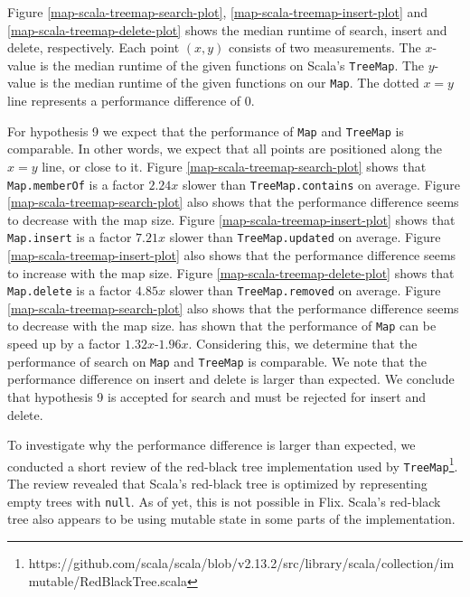 \documentclass[../main.tex]{subfiles}
\begin{document}
Figure \ref{map-scala-treemap-search-plot}, \ref{map-scala-treemap-insert-plot} and \ref{map-scala-treemap-delete-plot} shows the median \textsf{runtime} of search, insert and delete, respectively. Each point $(x, y)$ consists of two measurements. The $x$-value is the median runtime of the given functions on Scala's \lstinline{TreeMap}. The $y$-value is the median runtime of the given functions on our \lstinline{Map}. The dotted $x = y$ line represents a performance difference of $0$.

For hypothesis 9 we expect that the performance of \lstinline{Map} and \lstinline{TreeMap} is comparable. In other words, we expect that all points are positioned along the $x = y$ line, or close to it. Figure \ref{map-scala-treemap-search-plot} shows that \lstinline{Map.memberOf} is a factor $2.24x$ slower than \lstinline{TreeMap.contains} on average. Figure \ref{map-scala-treemap-search-plot} also shows that the performance difference seems to decrease with the map size. Figure \ref{map-scala-treemap-insert-plot} shows that \lstinline{Map.insert} is a factor $7.21x$ slower than \lstinline{TreeMap.updated} on average. Figure \ref{map-scala-treemap-insert-plot} also shows that the performance difference seems to increase with the map size. Figure \ref{map-scala-treemap-delete-plot} shows that \lstinline{Map.delete} is a factor $4.85x$ slower than \lstinline{TreeMap.removed} on average. Figure \ref{map-scala-treemap-search-plot} also shows that the performance difference seems to decrease with the map size. \citet{dahse-2020} has shown that the performance of \lstinline{Map} can be speed up by a factor $1.32x$-$1.96x$. Considering this, we determine that the performance of search on \lstinline{Map} and \lstinline{TreeMap} is comparable. We note that the performance difference on insert and delete is larger than expected. We conclude that hypothesis 9 is accepted for search and must be rejected for insert and delete.

To investigate why the performance difference is larger than expected, we conducted a short review of the red-black tree implementation used by \lstinline{TreeMap}\footnote{https://github.com/scala/scala/blob/v2.13.2/src/library/scala/collection/immutable/RedBlackTree.scala}. The review revealed that Scala's red-black tree is optimized by representing empty trees with \lstinline{null}. As of yet, this is not possible in Flix. Scala's red-black tree also appears to be using mutable state in some parts of the implementation.
\end{document}
